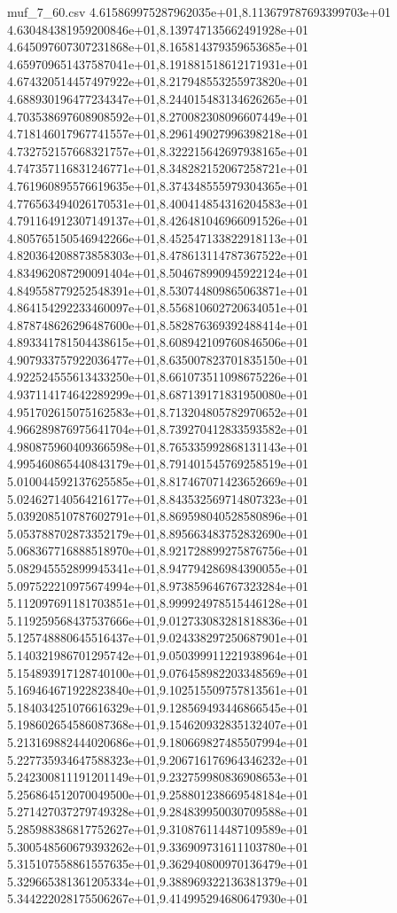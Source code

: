 \begin{filecontents*}{muf_7_60.csv}
4.615869975287962035e+01,8.113679787693399703e+01
4.630484381959200846e+01,8.139747135662491928e+01
4.645097607307231868e+01,8.165814379359653685e+01
4.659709651437587041e+01,8.191881518612171931e+01
4.674320514457497922e+01,8.217948553255973820e+01
4.688930196477234347e+01,8.244015483134626265e+01
4.703538697608908592e+01,8.270082308096607449e+01
4.718146017967741557e+01,8.296149027996398218e+01
4.732752157668321757e+01,8.322215642697938165e+01
4.747357116831246771e+01,8.348282152067258721e+01
4.761960895576619635e+01,8.374348555979304365e+01
4.776563494026170531e+01,8.400414854316204583e+01
4.791164912307149137e+01,8.426481046966091526e+01
4.805765150546942266e+01,8.452547133822918113e+01
4.820364208873858303e+01,8.478613114787367522e+01
4.834962087290091404e+01,8.504678990945922124e+01
4.849558779252548391e+01,8.530744809865063871e+01
4.864154292233460097e+01,8.556810602720634051e+01
4.878748626296487600e+01,8.582876369392488414e+01
4.893341781504438615e+01,8.608942109760846506e+01
4.907933757922036477e+01,8.635007823701835150e+01
4.922524555613433250e+01,8.661073511098675226e+01
4.937114174642289299e+01,8.687139171831950080e+01
4.951702615075162583e+01,8.713204805782970652e+01
4.966289876975641704e+01,8.739270412833593582e+01
4.980875960409366598e+01,8.765335992868131143e+01
4.995460865440843179e+01,8.791401545769258519e+01
5.010044592137625585e+01,8.817467071423652669e+01
5.024627140564216177e+01,8.843532569714807323e+01
5.039208510787602791e+01,8.869598040528580896e+01
5.053788702873352179e+01,8.895663483752832690e+01
5.068367716888518970e+01,8.921728899275876756e+01
5.082945552899945341e+01,8.947794286984390055e+01
5.097522210975674994e+01,8.973859646767323284e+01
5.112097691181703851e+01,8.999924978515446128e+01
5.119259568437537666e+01,9.012733083281818836e+01
5.125748880645516437e+01,9.024338297250687901e+01
5.140321986701295742e+01,9.050399911221938964e+01
5.154893917128740100e+01,9.076458982203348569e+01
5.169464671922823840e+01,9.102515509757813561e+01
5.184034251076616329e+01,9.128569493446866545e+01
5.198602654586087368e+01,9.154620932835132407e+01
5.213169882444020686e+01,9.180669827485507994e+01
5.227735934647588323e+01,9.206716176964346232e+01
5.242300811191201149e+01,9.232759980836908653e+01
5.256864512070049500e+01,9.258801238669548184e+01
5.271427037279749328e+01,9.284839950030709588e+01
5.285988386817752627e+01,9.310876114487109589e+01
5.300548560679393262e+01,9.336909731611103780e+01
5.315107558861557635e+01,9.362940800970136479e+01
5.329665381361205334e+01,9.388969322136381379e+01
5.344222028175506267e+01,9.414995294680647930e+01

\end{filecontents*}

